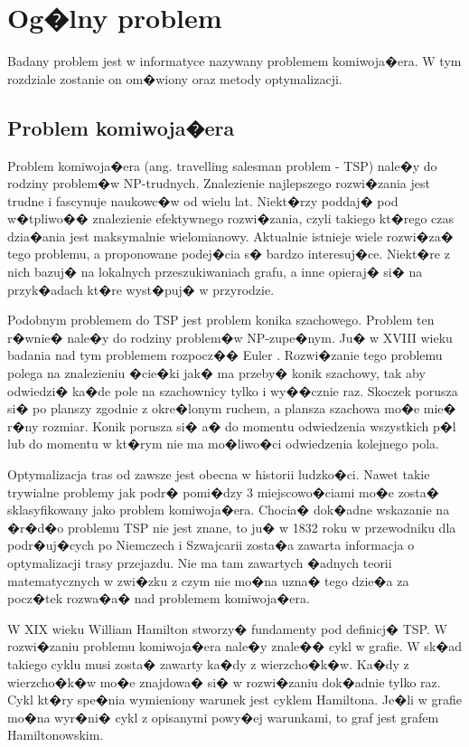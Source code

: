 \chapter{Og�lny problem}
Badany problem jest w informatyce nazywany problemem komiwoja�era. W tym rozdziale zostanie on om�wiony oraz metody optymalizacji.

\section{Problem komiwoja�era} 
Problem komiwoja�era (ang. travelling salesman problem - TSP) nale�y do rodziny problem�w NP-trudnych. Znalezienie najlepszego rozwi�zania jest trudne i fascynuje naukowc�w od wielu lat. Niekt�rzy poddaj� pod w�tpliwo�� znalezienie efektywnego rozwi�zania, czyli takiego kt�rego czas dzia�ania jest maksymalnie wielomianowy. Aktualnie istnieje wiele rozwi�za� tego problemu, a proponowane podej�cia s� bardzo interesuj�ce. Niekt�re z nich bazuj� na lokalnych przeszukiwaniach grafu, a inne opieraj� si� na przyk�adach kt�re wyst�puj� w przyrodzie.

Podobnym problemem do TSP jest problem konika szachowego. Problem ten r�wnie� nale�y do rodziny problem�w NP-zupe�nym. Ju� w XVIII wieku badania nad tym problemem rozpocz�� Euler \cite{euler_2}. Rozwi�zanie tego problemu polega na znalezieniu �cie�ki jak� ma przeby� konik szachowy, tak aby odwiedzi� ka�de pole na szachownicy tylko i wy��cznie raz. Skoczek porusza si� po planszy zgodnie z okre�lonym ruchem, a plansza szachowa mo�e mie� r�ny rozmiar. Konik porusza si� a� do momentu odwiedzenia wszystkich p�l lub do momentu w kt�rym nie ma mo�liwo�ci odwiedzenia kolejnego pola.

Optymalizacja tras od zawsze jest obecna w historii ludzko�ci. Nawet takie trywialne problemy jak podr� pomi�dzy 3 miejscowo�ciami mo�e zosta� sklasyfikowany jako problem komiwoja�era. Chocia� dok�adne wskazanie na �r�d�o problemu TSP nie jest znane, to ju� w 1832 roku w przewodniku dla podr�uj�cych po Niemczech i Szwajcarii zosta�a zawarta informacja o optymalizacji trasy przejazdu. Nie ma tam zawartych �adnych teorii matematycznych w zwi�zku z czym nie mo�na uzna� tego dzie�a za pocz�tek rozwa�a� nad problemem komiwoja�era.\cite{kl_poczatek_rozwazan}

W XIX wieku William Hamilton stworzy� fundamenty pod definicj� TSP. W rozwi�zaniu problemu komiwoja�era nale�y znale�� cykl w grafie. W sk�ad takiego cyklu musi zosta� zawarty ka�dy z wierzcho�k�w. Ka�dy z wierzcho�k�w mo�e znajdowa� si� w rozwi�zaniu dok�adnie tylko raz. Cykl kt�ry spe�nia wymieniony warunek jest cyklem Hamiltona. Je�li w grafie mo�na wyr�ni� cykl z opisanymi powy�ej warunkami, to graf jest grafem Hamiltonowskim. 

